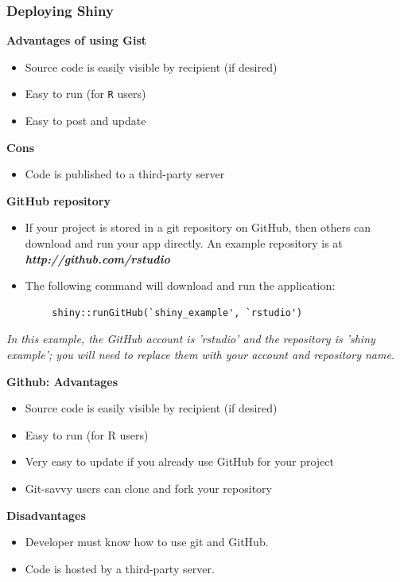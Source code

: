 \documentclass{beamer}
\begin{document}
\begin{frame}
	\Large
	\frametitle{Deploying Shiny}
	\textbf{Advantages of using Gist} 
	\begin{itemize}
		\item Source code is easily visible by recipient (if desired)
		\item Easy to run (for \texttt{R} users)
		\item Easy to post and update
	\end{itemize} 
	\textbf{Cons} \begin{itemize}
		\item Code is published to a third-party server
	\end{itemize}
\end{frame}

\begin{frame}[fragile]
	\Large
	\textbf{GitHub repository}
	\begin{itemize}
		\item If your project is stored in a git repository on GitHub, then others can download and run your app directly. An example repository is at \textit{\textbf{http://github.com/rstudio}}
		\item The following command will download and run the application:
	\end{itemize}
	\large
	\begin{framed}
		\begin{verbatim}
		shiny::runGitHub(`shiny_example', `rstudio')
		\end{verbatim}
	\end{framed}
	\normalsize
	\textit{In this example, the GitHub account is 'rstudio' and the repository is 'shiny example'; you will need to replace them with your account and repository name.}
\end{frame}

\begin{frame}
	\Large
	\textbf{Github: Advantages} \begin{itemize}
		\item  Source code is easily visible by recipient (if desired)
		\item Easy to run (for R users)
		\item Very easy to update if you already use GitHub for your project
		\item Git-savvy users can clone and fork your repository
	\end{itemize} \textbf{Disadvantages} \begin{itemize}
	\item Developer must know how to use git and GitHub.
	\item Code is hosted by a third-party server.
\end{itemize}
\end{frame}
\end{document}
